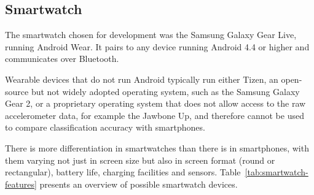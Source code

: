     
    \subsection{Smartwatch}
      \label{sec:smartwatch}
      The smartwatch chosen for development was the Samsung Galaxy Gear Live, running Android Wear.
      It pairs to any device running Android 4.4 or higher and communicates over Bluetooth.
      
      Wearable devices that do not run Android typically run either Tizen, an open-source but not 
      widely adopted operating system, such as the Samsung Galaxy Gear 2, or a proprietary 
      operating system that does not allow access to the raw accelerometer data, for example the 
      Jawbone Up, and therefore cannot be used to compare classification accuracy with smartphones.
      
      There is more differentiation in smartwatches than there is in smartphones, with them varying
      not just in screen size but also in screen format (round or rectangular), battery life,
      charging facilities and sensors. Table~\ref{tab:smartwatch-features} presents an overview of possible smartwatch devices.
      
